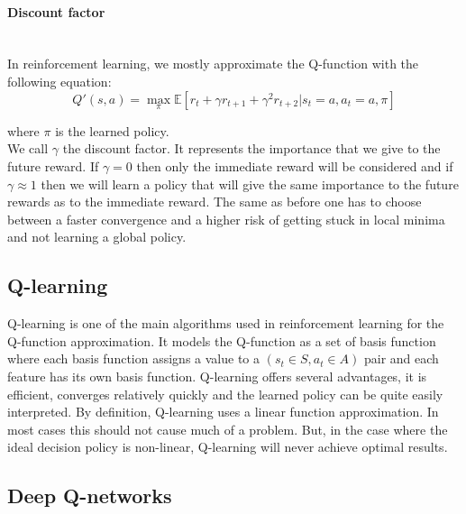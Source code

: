 \paragraph{Discount factor}\mbox{}\\
In reinforcement learning, we mostly approximate the Q-function with the following equation:
\begin{equation}
	Q'(s,a) = \max_{\pi} \mathbb{E}[r_t+\gamma r_{t+1}+\gamma^2 r_{t+2}| s_t=a, a_t = a,\pi]
\end{equation}

where $\pi$ is the learned policy.\\
We call $\gamma$ the discount factor. It represents the importance that we give to the future reward. If $\gamma = 0$ then only the immediate reward will be considered and if $\gamma \approx 1$ then we will learn a policy that will give the same importance to the future rewards as to the immediate reward. The same as before one has to choose between a faster convergence and a higher risk of getting stuck in local minima and not learning a global policy.

 
\subsection{Q-learning}
Q-learning\cite{watkins1992q} is one of the main algorithms used in reinforcement learning for the Q-function approximation. It models the Q-function as a set of basis function where each basis function assigns a value to a $(s_t \in S,a_t \in A)$ pair and each feature has its own basis function. Q-learning offers several advantages, it is efficient, converges relatively quickly and the learned policy can be quite easily interpreted. By definition, Q-learning uses a linear function approximation. In most cases this should not cause much of a problem. But, in the case where the ideal decision policy is non-linear, Q-learning will never achieve optimal results.
\subsection{Deep Q-networks}

